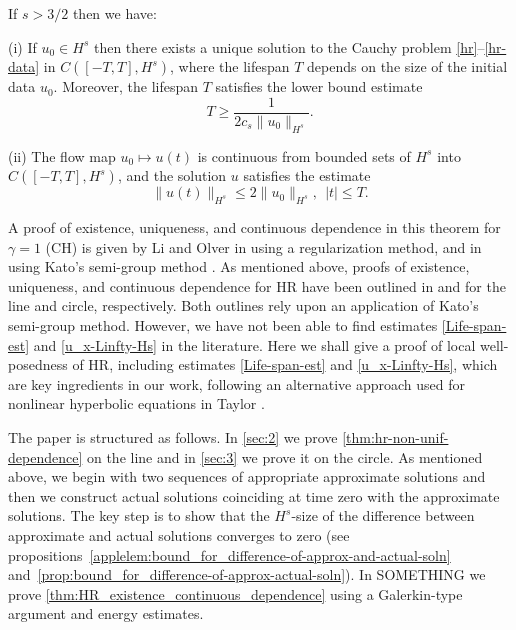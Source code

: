%
%
%
%
%
%
\begin{theorem}
\label{thm:HR_existence_continuous_dependence}
If   $s>3/2$  then we have:

(i) If $u_0\in H^s$  then  there exists a unique solution to
the Cauchy problem  \eqref{hr}--\eqref{hr-data} in $C([-T, T], H^s)$, where 
the lifespan  $T$ depends on the size
of the initial data $u_0$. Moreover, 
the  lifespan $T$ satisfies the lower bound estimate 
%
%
%
\begin{equation}
\label{Life-span-est}
T
\ge
\frac{1}{2c_s \|u_0\|_{H^s}}.
\end{equation}
%

(ii)
The flow map $u_0 \mapsto u(t)$ is continuous from
bounded sets of $H^s$ into \\ $C([-T, T], H^s)$,
and the solution $u$ satisfies the estimate
%
%
%
\begin{equation}
\label{u_x-Linfty-Hs}
\|
u(t)
\|_ {H^s}
\le
2
\|
u_0
\|_{H^s}, \ \ |t|\le T.
\end{equation}
%
%
%
\end{theorem}
%
%
A proof of existence, uniqueness, and continuous dependence in this 
theorem for $\gamma =1$ (CH) 
is given  by Li and Olver in 
\cite{Li_2000_Well-posedness-} using a regularization method, and in
\cite{Rodriguez-Blanco_2001_On-the-Cauchy-p} using 
Kato's semi-group method \cite{Kato_1975_Quasi-linear-eq}. As mentioned 
above, proofs of 
existence, uniqueness, and continuous dependence for  HR
have been outlined in \cite{Yin_2003_On-the-Cauchy-p} and 
\cite{Zhou_2005_Local-well-pose} for the line and circle, 
respectively. Both outlines rely upon an application of Kato's semi-group 
method. However, we have not been able to find estimates  
\eqref{Life-span-est} and \eqref{u_x-Linfty-Hs}  in the literature.
Here we shall give a proof of local well-posedness of HR,
including  estimates \eqref{Life-span-est} and \eqref{u_x-Linfty-Hs},
which are key ingredients in our work, 
following an alternative approach used for nonlinear hyperbolic equations
in Taylor \cite{Taylor_1991_Pseudodifferent}.

The paper is structured as follows. In \cref{sec:2} we prove 
\cref{thm:hr-non-unif-dependence} on the line and 
in  \cref{sec:3}  we prove it on the circle.
As mentioned above, we begin with two sequences of
appropriate approximate solutions and then 
we construct  actual solutions
coinciding at time zero  with the approximate solutions.
The key step is to show that  the $H^s$-size of
the difference between approximate and actual solutions 
converges to zero (see propositions~\ref{applelem:bound_for_difference-of-approx-and-actual-soln}
and~\ref{prop:bound_for_difference-of-approx-actual-soln}). 
In SOMETHING we prove \cref{thm:HR_existence_continuous_dependence} 
using a Galerkin-type argument and energy estimates.
%
%
%
%	
%
%
%
%
%
%
%
%
%
%
%
